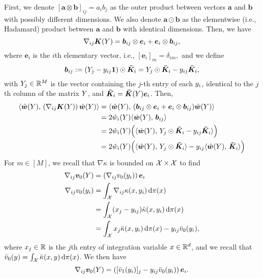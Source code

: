 First, we denote $[\bm{a}\otimes\bm{b}]_{ij} = a_ib_j$ as the outer product between vectors $\bm{a}$ and $\bm{b}$ with possibly different dimensions. We also denote $\bm{a}\odot\bm{b}$ as the elementwise (i.e., Hadamard) product between $\bm{a}$ and $\bm{b}$ with identical dimensions. Then, we have
\begin{equation*}
        \nabla_{ij} \bm{K}(Y) = \bm{b}_{ij}\otimes \bm{e}_i + \bm{e}_i\otimes \bm{b}_{ij},
\end{equation*}
where $\bm{e}_i$ is the $i$th elementary vector, i.e., $[\bm{e}_i]_{m} = \delta_{im},$ and we define
\begin{equation*}
        \bm{b}_{ij} := (Y_j - y_{ij}\bm{1})\odot \bm{\bar{K}}_i = Y_{j}\odot \bm{\bar{K}}_i - y_{ij} \bm{\bar{K}}_i,
\end{equation*}
with $Y_{j} \in \mathbb{R}^{M}$ is the vector containing the $j$-th entry of each $y_{i}$, identical to the $j$th column of the matrix $Y$, and $\bm{\bar{K}}_i = \bm{\bar{K}}(Y)\bm{e}_i$. Then,
\begin{align}\label{eq:w_hat_grad_K_w_hat_final}
\langle\hat{\bm{w}}(Y),\,(\nabla_{ij}\bm{K}(Y))\,\hat{\bm{w}}(Y)\rangle &= \langle\hat{\bm{w}}(Y),\, (\bm{b}_{ij}\otimes\bm{e}_i + \bm{e}_i\otimes\bm{b}_{ij})\hat{\bm{w}}(Y)\rangle\nonumber\\
&= 2 \hat{w}_{i}(Y) \langle \hat{\bm{w}}(Y),\,\bm{b}_{ij}\rangle \nonumber \\
&= 2 \hat{w}_{i}(Y) \Big( \langle\hat{\bm{w}}(Y),\,Y_{j}\odot \bm{\bar{K}}_i - y_{ij} \bm{\bar{K}}_i\rangle\Big) \nonumber \\
&= 2 \hat{w}_{i}(Y) \Big( \langle\hat{\bm{w}}(Y),\, Y_{j}\odot \bm{\bar{K}}_i\rangle - y_{ij}\langle\hat{\bm{w}}(Y),\, \bm{\bar{K}}_i\rangle \Big)
\end{align}
 For $m \in [M]$, we recall that $\nabla\kappa$ is bounded on $\mathcal{X}\times\mathcal{X}$ to find
 \begin{align*}
\nabla_{ij} \bm{v}_{0}(Y) &= \left(\nabla_{ij} v_{0}(y_{i})\right)\bm{e}_i\\
\nabla_{ij} v_{0}(y_{i})&= \int_{\mathcal{X}} \nabla_{ij} \kappa( x,y_{i}) \,\mathrm{d}\pi(x) \\
& = \int_{\mathcal{X}}  (x_{j}-y_{ij})\bar{\kappa}(x,y_{i}) \,\mathrm{d}\pi(x)\\
& = \int_{\mathcal{X}}    x_{j}\bar{\kappa}( x,y_{i}) \,\mathrm{d}\pi(x) -y_{ij}  \bar{v}_{0}(y_{i}),
 \end{align*}
where $x_{j}\in\mathbb{R}$ is the $j$th entry of integration variable $x\in\mathbb{R}^d$, and we recall that $\bar{v}_{0}(y)= \int_{\mathcal{X}} \bar{\kappa}(x,y) \,\mathrm{d}\pi(x)$. We then have
\begin{equation*}
    \nabla_{ij} \bm{v}_{0}(Y) =  \left( [\bar{v}_{1}(y_{i})]_{j}  - y_{ij}\bar{v}_{0}(y_{i})\right)\bm{e}_i.
\end{equation*}



